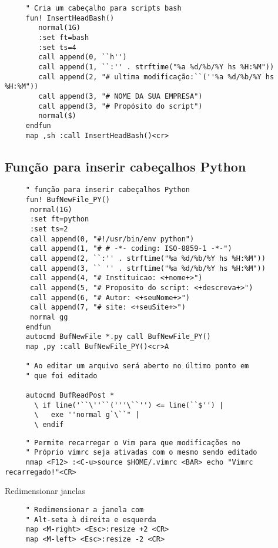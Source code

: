 \begin{verbatim}
     " Cria um cabeçalho para scripts bash
     fun! InsertHeadBash()
        normal(1G)
        :set ft=bash
        :set ts=4
        call append(0, ``h'')
        call append(1, ``:'' . strftime("%a %d/%b/%Y hs %H:%M"))
        call append(2, "# ultima modificação:``(''%a %d/%b/%Y hs %H:%M"))
        call append(3, "# NOME DA SUA EMPRESA")
        call append(3, "# Propósito do script")
        normal($)
     endfun
     map ,sh :call InsertHeadBash()<cr>
\end{verbatim}

\subsection{Função para inserir cabeçalhos Python}
\label{Função para inserir cabeçalhos Python}

\begin{verbatim}
     " função para inserir cabeçalhos Python
     fun! BufNewFile_PY()
      normal(1G)
      :set ft=python
      :set ts=2
      call append(0, "#!/usr/bin/env python")
      call append(1, "# # -*- coding: ISO-8859-1 -*-")
      call append(2, ``:'' . strftime("%a %d/%b/%Y hs %H:%M"))
      call append(3, `` '' . strftime("%a %d/%b/%Y hs %H:%M"))
      call append(4, "# Instituicao: <+nome+>")
      call append(5, "# Proposito do script: <+descreva+>")
      call append(6, "# Autor: <+seuNome+>")
      call append(7, "# site: <+seuSite+>")
      normal gg
     endfun
     autocmd BufNewFile *.py call BufNewFile_PY()
     map ,py :call BufNewFile_PY()<cr>A
   
     " Ao editar um arquivo será aberto no último ponto em
     " que foi editado
   
     autocmd BufReadPost *
       \ if line('``\''``('''\``'') <= line(``$'') |
       \   exe ''normal g`\``" |
       \ endif
\end{verbatim}

\begin{verbatim}
     " Permite recarregar o Vim para que modificações no
     " Próprio vimrc seja ativadas com o mesmo sendo editado
     nmap <F12> :<C-u>source $HOME/.vimrc <BAR> echo "Vimrc recarregado!"<CR>
\end{verbatim}

Redimensionar janelas

\begin{verbatim}
     " Redimensionar a janela com
     " Alt-seta à direita e esquerda
     map <M-right> <Esc>:resize +2 <CR>
     map <M-left> <Esc>:resize -2 <CR>
\end{verbatim}

